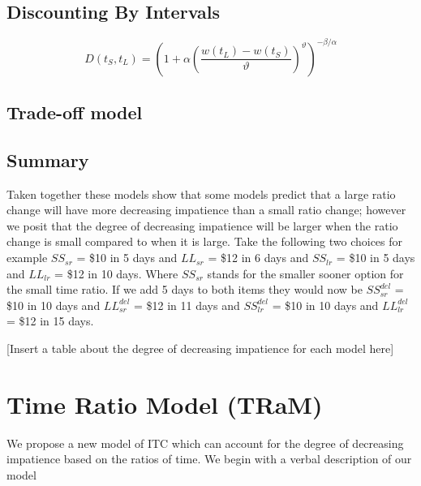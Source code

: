 \documentclass[]{article}
\begin{document}
\subsection{Discounting By Intervals}

\begin{equation}\label{eq:int}
	D(t_S, t_L) = \left(1 + \alpha \left(\frac{w(t_L) - w(t_S)}{\vartheta}\right)^{\vartheta}\right)^{-\beta/\alpha}
\end{equation}


\subsection{Trade-off model}


\subsection{Summary}
Taken together these models show that some models predict that a large ratio change will have more decreasing impatience than a small ratio change; however we posit that the degree of  decreasing impatience will be larger when the ratio change is small compared to when it is large.
Take the following two choices for example $SS_{sr}$ = \$10 in 5 days and $LL_{sr}$ = \$12 in 6 days and $SS_{lr}$ = \$10 in 5 days and $LL_{lr}$ = \$12 in 10 days. Where $SS_{sr}$ stands for the smaller sooner option for the small time ratio. 
If we add 5 days to both items they would now be $SS_{sr}^{del}$ = \$10 in 10 days and $LL_{sr}^{del}$ = \$12 in 11 days and $SS_{lr}^{del}$ = \$10 in 10 days and $LL_{lr}^{del}$ = \$12 in 15 days. 

[Insert a table about the degree of decreasing impatience for each model here]

\section{Time Ratio Model (TRaM)}

We propose a new model of ITC which can account for the degree of decreasing impatience based on the ratios of time. 
We begin with a verbal description of our model
\end{document}
